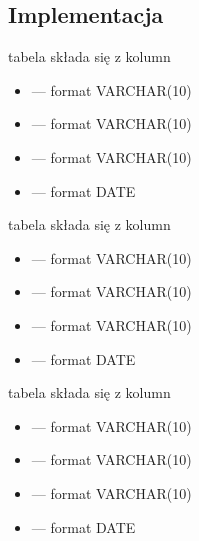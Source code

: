 \documentclass[letterpaper,10pt,polish]{sphinxmanual}
\begin{document}
\subsection{Implementacja }
\label{\detokenize{rozdzial3/index:implementacja-postgresql}}
\sphinxAtStartPar
tabela  składa się z kolumn
\begin{itemize}
\item {} 
\sphinxAtStartPar
{} — format VARCHAR(10)

\item {} 
\sphinxAtStartPar
{} — format VARCHAR(10)

\item {} 
\sphinxAtStartPar
{} — format VARCHAR(10)

\item {} 
\sphinxAtStartPar
{} — format DATE

\end{itemize}

\sphinxAtStartPar
tabela  składa się z kolumn
\begin{itemize}
\item {} 
\sphinxAtStartPar
{} — format VARCHAR(10)

\item {} 
\sphinxAtStartPar
{} — format VARCHAR(10)

\item {} 
\sphinxAtStartPar
{} — format VARCHAR(10)

\item {} 
\sphinxAtStartPar
{} — format DATE

\end{itemize}

\sphinxAtStartPar
tabela  składa się z kolumn
\begin{itemize}
\item {} 
\sphinxAtStartPar
{} — format VARCHAR(10)

\item {} 
\sphinxAtStartPar
{} — format VARCHAR(10)

\item {} 
\sphinxAtStartPar
{} — format VARCHAR(10)

\item {} 
\sphinxAtStartPar
{} — format DATE

\end{itemize}
\end{document}
